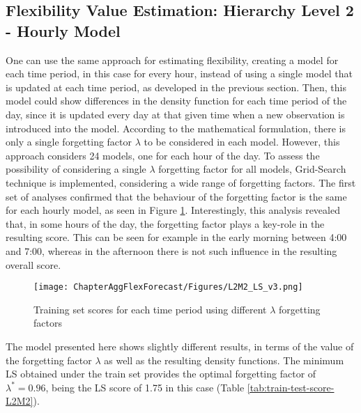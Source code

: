 \subsection{Flexibility Value Estimation: Hierarchy Level 2 - Hourly Model}  \label{Sect:ResultsLevel224hModel}

One can use the same approach for estimating flexibility, creating a model for each time period, in this case for every hour, instead of using a single model that is updated at each time period, as developed in the previous section. Then, this model could show differences in the density function for each time period of the day, since it is updated every day at that given time when a new observation is introduced into the model. According to the mathematical formulation, there is only a single forgetting factor $\lambda$ to be considered in each model. However, this approach considers 24 models, one for each hour of the day. To assess the possibility of considering a single $\lambda$ forgetting factor for all models, Grid-Search technique is implemented, considering a wide range of forgetting factors. The first set of analyses confirmed that the behaviour of the forgetting factor is the same for each hourly model, as seen in Figure \ref{fig:L2_M2_LS}. Interestingly, this analysis revealed that, in some hours of the day, the forgetting factor plays a key-role in the resulting score. This can be seen for example in the early morning between 4:00 and 7:00, whereas in the afternoon there is not such influence in the resulting overall score.  

\begin{figure}[]
\centerline{\texttt{[image: ChapterAggFlexForecast/Figures/L2M2\_LS\_v3.png]}}
\caption{Training set scores for each time period using different $\lambda$ forgetting factors}
\label{fig:L2_M2_LS}
\end{figure}

The model presented here shows slightly different results, in terms of the value of the forgetting factor $\lambda$ as well as the resulting density functions. The minimum LS obtained under the train set provides the optimal forgetting factor of $\lambda^* = 0.96$, being the LS score of 1.75 in this case (Table \ref{tab:train-test-score-L2M2}). 

\begin{table}[]
\centering
\caption{Results of the cross validation procedure for hyperparameter definition for the Hourly Model in the second level of the hierarchy, using LS as a performance score.}
\label{tab:train-test-score-L2M2}
\end{table}

